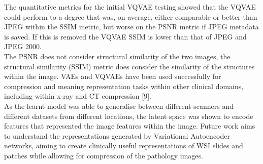 \documentclass[review]{elsarticle}
\begin{document}

The quantitative metrics for the initial VQVAE testing showed that the VQVAE could perform to a degree that was, on average, either comparable or better than JPEG within the SSIM metric, but worse on the PSNR metric if JPEG metadata is saved. If this is removed the VQVAE SSIM is lower than that of JPEG and JPEG 2000. \\
The PSNR does not consider structural similarity of the two images, the structural similarity (SSIM) metric does consider the similarity of the structures within the image. 
VAEs and VQVAEs have been used successfully for compression and meaning representation tasks within other clinical domains, including within x-ray and CT compression [9]. \\
As the learnt model was able to generalise between different scanners and different datasets from different locations, the latent space was shown to encode features that represented the image features within the image. Future work aims to understand the representations generated by Variational Autoencoder networks, aiming to create clinically useful representations of WSI slides and patches while allowing for compression of the pathology images. 



\end{document}
